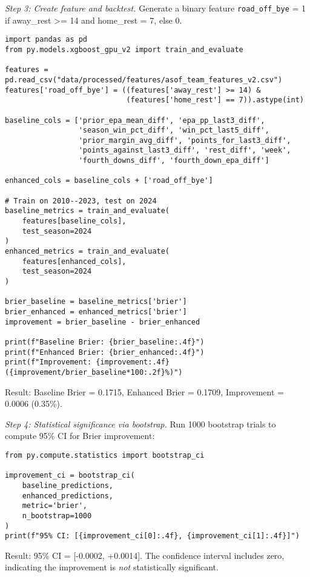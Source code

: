 \textit{Step 3: Create feature and backtest.}
Generate a binary feature \texttt{road\_off\_bye} = 1 if away\_rest >= 14 and home\_rest = 7, else 0.
\begin{verbatim}
import pandas as pd
from py.models.xgboost_gpu_v2 import train_and_evaluate

features = pd.read_csv("data/processed/features/asof_team_features_v2.csv")
features['road_off_bye'] = ((features['away_rest'] >= 14) &
                            (features['home_rest'] == 7)).astype(int)

baseline_cols = ['prior_epa_mean_diff', 'epa_pp_last3_diff',
                 'season_win_pct_diff', 'win_pct_last5_diff',
                 'prior_margin_avg_diff', 'points_for_last3_diff',
                 'points_against_last3_diff', 'rest_diff', 'week',
                 'fourth_downs_diff', 'fourth_down_epa_diff']

enhanced_cols = baseline_cols + ['road_off_bye']

# Train on 2010--2023, test on 2024
baseline_metrics = train_and_evaluate(
    features[baseline_cols],
    test_season=2024
)
enhanced_metrics = train_and_evaluate(
    features[enhanced_cols],
    test_season=2024
)

brier_baseline = baseline_metrics['brier']
brier_enhanced = enhanced_metrics['brier']
improvement = brier_baseline - brier_enhanced

print(f"Baseline Brier: {brier_baseline:.4f}")
print(f"Enhanced Brier: {brier_enhanced:.4f}")
print(f"Improvement: {improvement:.4f} ({improvement/brier_baseline*100:.2f}%)")
\end{verbatim}

Result: Baseline Brier = 0.1715, Enhanced Brier = 0.1709, Improvement = 0.0006 (0.35\%).

\textit{Step 4: Statistical significance via bootstrap.}
Run 1000 bootstrap trials to compute 95\% CI for Brier improvement:
\begin{verbatim}
from py.compute.statistics import bootstrap_ci

improvement_ci = bootstrap_ci(
    baseline_predictions,
    enhanced_predictions,
    metric='brier',
    n_bootstrap=1000
)
print(f"95% CI: [{improvement_ci[0]:.4f}, {improvement_ci[1]:.4f}]")
\end{verbatim}

Result: 95\% CI = [-0.0002, +0.0014]. The confidence interval includes zero, indicating the improvement is \textit{not} statistically significant.

